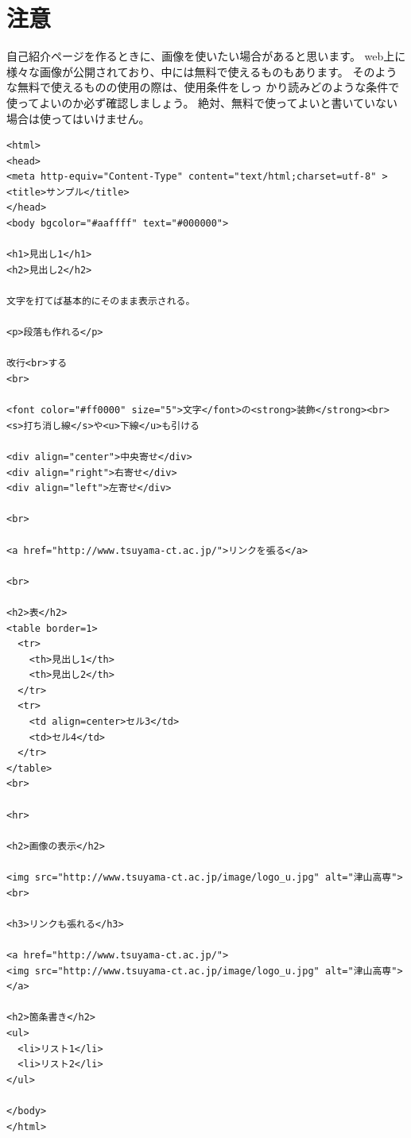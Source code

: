 \documentclass[12pt, a4j]{jsarticle}
\begin{document}
\section{注意}

自己紹介ページを作るときに、画像を使いたい場合があると思います。
web上に様々な画像が公開されており、中には無料で使えるものもあります。
そのような無料で使えるものの使用の際は、使用条件をしっ
かり読みどのような条件で使ってよいのか必ず確認しましょう。
絶対、無料で使ってよいと書いていない場合は使ってはいけません。

\newpage

\small
\begin{verbatim}
<html>
<head>
<meta http-equiv="Content-Type" content="text/html;charset=utf-8" >
<title>サンプル</title>
</head>
<body bgcolor="#aaffff" text="#000000">

<h1>見出し1</h1>
<h2>見出し2</h2>

文字を打てば基本的にそのまま表示される。

<p>段落も作れる</p>

改行<br>する
<br>

<font color="#ff0000" size="5">文字</font>の<strong>装飾</strong><br>
<s>打ち消し線</s>や<u>下線</u>も引ける

<div align="center">中央寄せ</div>
<div align="right">右寄せ</div>
<div align="left">左寄せ</div>

<br>

<a href="http://www.tsuyama-ct.ac.jp/">リンクを張る</a>

<br>

<h2>表</h2>
<table border=1>
  <tr>
    <th>見出し1</th>
    <th>見出し2</th>
  </tr>
  <tr>
    <td align=center>セル3</td>
    <td>セル4</td>
  </tr>
</table>
<br>

<hr>

<h2>画像の表示</h2>

<img src="http://www.tsuyama-ct.ac.jp/image/logo_u.jpg" alt="津山高専"><br>

<h3>リンクも張れる</h3>

<a href="http://www.tsuyama-ct.ac.jp/">
<img src="http://www.tsuyama-ct.ac.jp/image/logo_u.jpg" alt="津山高専"></a>

<h2>箇条書き</h2>
<ul>
  <li>リスト1</li>
  <li>リスト2</li>
</ul>

</body>
</html>
\end{verbatim}
\end{document}
